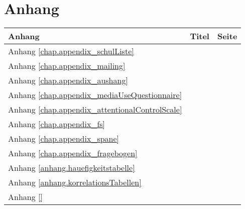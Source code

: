 %
%
\glsresetall
\let\raggedsection\centering 
\chapter*{Anhang}\label{chap.appendixStart}
\let\raggedsection\raggedright 
\begin{RaggedRight}
\begin{table}[H] 
    \centering
    \begin{tabular}[t]{L{30mm} L{100mm} R{20mm}}       
        \textbf{Anhang} & \textbf{Titel} & \textbf{Seite}\\
        \hline
        Anhang \ref{chap.appendix_schulListe} &  & \pageref{chap.appendix_schulListe} \\ 
        Anhang \ref{chap.appendix_mailing} &  & \pageref{chap.appendix_mailing} \\ 
        Anhang \ref{chap.appendix_aushang} &  & \pageref{chap.appendix_aushang} \\ 
        Anhang \ref{chap.appendix_mediaUseQuestionnaire} &  & \pageref{chap.appendix_mediaUseQuestionnaire} \\ 
        Anhang \ref{chap.appendix_attentionalControlScale} &  & \pageref{chap.appendix_attentionalControlScale} \\ 
        Anhang \ref{chap.appendix_fs} &  & \pageref{chap.appendix_fs} \\ 
        Anhang \ref{chap.appendix_spane} &  & \pageref{chap.appendix_spane} \\ 
        Anhang \ref{chap.appendix_fragebogen} &  & \pageref{chap.appendix_fragebogen} \\ 
        Anhang \ref{anhang.hauefigkeitstabelle} &  & \pageref{anhang.hauefigkeitstabelle} \\ 
        Anhang \ref{anhang.korrelationsTabellen} &  & \pageref{anhang.korrelationsTabellen} \\ 
        Anhang \ref{} & \nameref{} & \pageref{} \\
    \end{tabular}
    \label{table.anhangsverzeichnis}
\end{table}
\end{RaggedRight}
